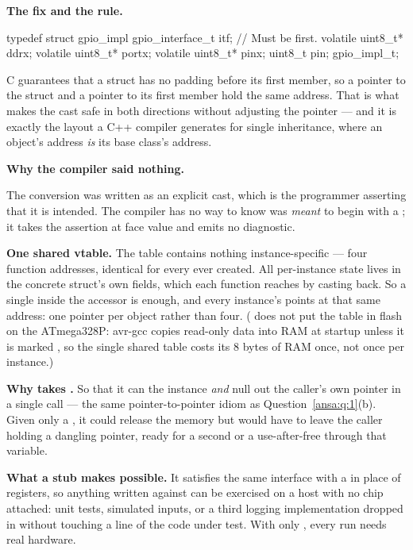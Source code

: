 \textbf{The fix and the rule.} 

\begin{ccode}
typedef struct gpio_impl
{
    gpio_interface_t itf; // Must be first.
    volatile uint8_t* ddrx;
    volatile uint8_t* portx;
    volatile uint8_t* pinx;
    uint8_t pin;
} gpio_impl_t;
\end{ccode}

\noindent C guarantees that a struct has no padding before its first member, so a pointer to the
struct and a pointer to its first member hold the same address. That is what makes the cast safe in
both directions without adjusting the pointer --- and it is exactly the layout a C++ compiler
generates for single inheritance, where an object's address \emph{is} its base class's address.

\textbf{Why the compiler said nothing.} 

The conversion was written as an explicit cast, which is the programmer asserting that it is
intended. The compiler has no way to know  was \emph{meant} to begin with a
; it takes the assertion at face value and emits no diagnostic.

\textbf{One shared vtable.} The table contains nothing instance-specific --- four function
addresses, identical for every  ever created. All per-instance state lives in the
concrete struct's own fields, which each function reaches by casting  back. So a single
 inside the accessor is enough, and every instance's
 points at that same address: one pointer per object rather than four.
( does not put the table in flash on the ATmega328P: avr-gcc copies read-only data into
RAM at startup unless it is marked , so the single shared table costs its 8 bytes of
RAM once, not once per instance.) 

\textbf{Why  takes .} So that it can  the
instance \emph{and} null out the caller's own pointer in a single call --- the same
pointer-to-pointer idiom as Question~\ref{ansa:q:1}(b). Given only a , it
could release the memory but would have to leave the caller holding a dangling pointer, ready for a
second  or a use-after-free through that variable. 

\textbf{What a stub makes possible.} It satisfies the same interface with a  in
place of registers, so anything written against  can be exercised on a host
with no chip attached: unit tests, simulated inputs, or a third logging implementation dropped in
without touching a line of the code under test. With only , every run needs real
hardware. 
